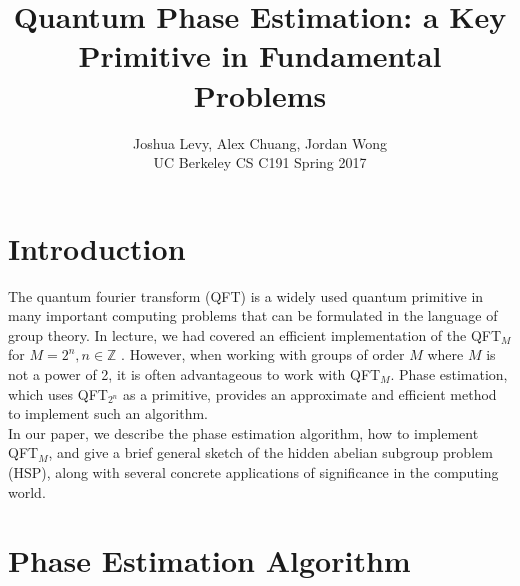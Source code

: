 \documentclass[11pt]{journal}
\title{Quantum Phase Estimation: a Key Primitive in Fundamental Problems}
\author{Joshua Levy, Alex Chuang, Jordan Wong\\UC Berkeley CS C191 Spring 2017}
\begin{document}
\maketitle

\section{Introduction}

The quantum fourier transform (QFT) is a widely used quantum primitive in many important computing problems that can be formulated in the language of group theory. In lecture, we had covered an efficient implementation of the QFT$_M$ for $M = 2^n, n \in \mathbb{Z}$ \cite{vaz}. However, when working with groups of order $M$ where $M$ is not a power of 2, it is often advantageous to work with QFT$_M$. Phase estimation, which uses QFT$_{2^n}$ as a primitive, provides an approximate and efficient method to implement such an algorithm.\\
\indent In our paper, we describe the phase estimation algorithm, how to implement QFT$_M$, and give a brief general sketch of the hidden abelian subgroup problem (HSP), along with several concrete applications of significance in the computing world.

\section{Phase Estimation Algorithm}
\end{document}
